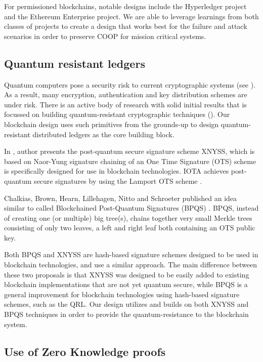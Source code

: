 For permissioned blockchains, notable designs include the Hyperledger project and the Ethereum Enterprise project. We are
able to leverage learnings from both classes of projects to create a design that works best for the failure and
attack scenarios in order to preserve COOP for mission critical systems.

\subsection{Quantum resistant ledgers}

Quantum computers pose a security risk to current cryptographic systems (see \cite{dasgupta2019}). As a result, many
encryption, authentication and key distribution schemes are under risk. There is an active body of research with solid
initial results that is focussed on building quantum-resistant cryptographic techniques (\cite{qrl2016}). Our blockchain design
uses such primitives from the grounds-up to design quantum-resistant distributed ledgers as the core building block.

In \cite{linde2018}, author presents the post-quantum secure signature scheme XNYSS, which is
based on Naor-Yung signature chaining of an One Time Signature (OTS) scheme is specifically designed for use in blockchain
technologies. IOTA \cite{iota2018} achieves post-quantum secure signatures by using the Lamport
OTS scheme \cite{lamport1979}.

Chalkias, Brown, Hearn, Lillehagen, Nitto and Schroeter published an idea similar to \cite{linde2018} called Blockchained
Post-Quantum Signatures (BPQS) \cite{bpqs}. BPQS, instead of creating one (or multiple) big tree(s), chains together very small
Merkle trees consisting of only two leaves, a left and right leaf both containing an OTS public key. 

Both BPQS and XNYSS are hash-based signature schemes designed to be used in blockchain technologies, and use a similar
approach. The main difference between these two proposals is that XNYSS was designed to be easily added to existing
blockchain implementations that are not yet quantum secure, while BPQS is a general improvement for blockchain
technologies using hash-based signature schemes, such as the QRL. Our design utilizes and builds on both XNYSS and BPQS
techniques in order to provide the quantum-resistance to the blockchain system.

\subsection{Use of Zero Knowledge proofs}


